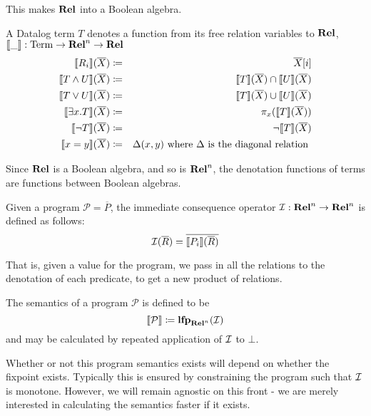 This makes $\mathbf{Rel}$ into a Boolean algebra.

\begin{defn}
  A Datalog term $T$ denotes a function from its free relation variables to
  $\mathbf{Rel}$, $\llbracket \_ \rrbracket : \mathrm{Term} \rightarrow \mathbf{Rel}^n \rightarrow \mathbf{Rel}$
  \begin{eqnarray*}
    \llbracket R_i \rrbracket(\overline{X}) &\coloneqq& \overline{X}[i] \\
    \llbracket T \wedge U \rrbracket(\overline{X}) &\coloneqq& \llbracket T \rrbracket(\overline{X}) \cap  \llbracket U \rrbracket(\overline{X})\\
    \llbracket T \vee U \rrbracket(\overline{X}) &\coloneqq& \llbracket T \rrbracket(\overline{X}) \cup  \llbracket U \rrbracket(\overline{X})\\
    \llbracket \exists x. T \rrbracket(\overline{X}) &\coloneqq& \pi_x(\llbracket T \rrbracket(\overline{X}))\\
    \llbracket \neg T \rrbracket(\overline{X}) &\coloneqq& \neg \llbracket T \rrbracket(\overline{X})\\
    \llbracket x=y \rrbracket(\overline{X}) &\coloneqq& \Delta(x, y) \text{ where } \Delta \text{ is the diagonal relation }
  \end{eqnarray*}
\end{defn}

Since $\mathbf{Rel}$ is a Boolean algebra, and so is $\mathbf{Rel}^n$, the denotation
functions of terms are functions between Boolean algebras.

\begin{defn}
  Given a program $\mathcal{P} = \overline{P}$, the immediate consequence operator $\mathcal{I}: \mathbf{Rel}^n \rightarrow \mathbf{Rel}^n$ is defined as follows:
  $$\mathcal{I}(\overline{R}) = \overline{\llbracket P_i \rrbracket(\overline{R})}$$
\end{defn}

That is, given a value for the program, we pass in all the relations
to the denotation of each predicate, to get a new product of relations.

\begin{defn}
  The semantics of a program $\mathcal{P}$ is defined to be 
  $$\llbracket \mathcal{P} \rrbracket \coloneqq \textbf{lfp}_{\mathbf{Rel}^n}(\mathcal{I})$$
  and may be calculated by repeated application of $\mathcal{I}$ to $\bot$.
\end{defn}

Whether or not this program semantics exists will depend on whether the fixpoint
exists. Typically this is ensured by constraining the program such that $\mathcal{I}$
is monotone. However, we will remain agnostic on this front - we are merely
interested in calculating the semantics faster if it exists.

